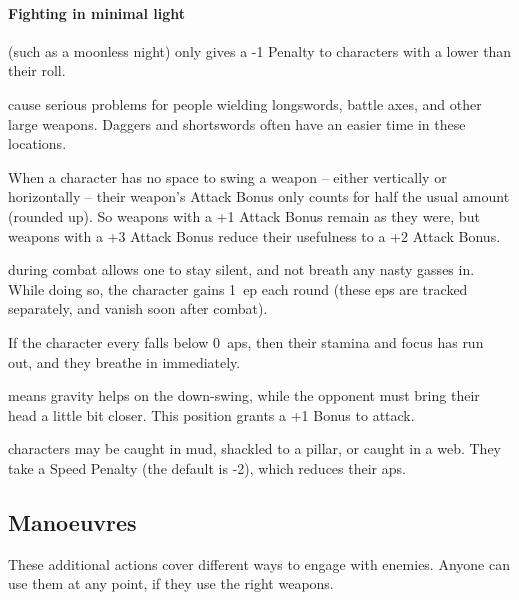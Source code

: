 \begin{multicols}{2}
\paragraph{Fighting in minimal light}
(such as a moonless night)
only gives a -1 Penalty to characters with a  lower than their roll.

cause serious problems for people wielding longswords, battle axes, and other large weapons.
Daggers and shortswords often have an easier time in these locations.

When a character has no space to swing a weapon -- either vertically or horizontally -- their weapon's Attack Bonus only counts for half the usual amount (rounded up).
So weapons with a +1 Attack Bonus remain as they were, but weapons with a +3 Attack Bonus reduce their usefulness to a +2 Attack Bonus.

during combat allows one to stay silent, and not breath any nasty gasses in.
While doing so, the character gains 1~\gls{ep} each round (these \glspl{ep} are tracked separately, and vanish soon after combat).

If the character every falls below 0~\glspl{ap}, then their stamina and focus has run out, and they breathe in immediately.

means gravity helps on the down-swing, while the opponent must bring their head a little bit closer.
This position grants a +1 Bonus to attack.

\label{trapped}
characters may be caught in mud, shackled to a pillar, or caught in a web.
They take a Speed Penalty (the default is -2), which reduces their \glspl{ap}.
\label{prone}

\subsection{Manoeuvres}

These additional actions cover different ways to engage with enemies.
Anyone can use them at any point, if they use the right weapons.


\end{multicols}
